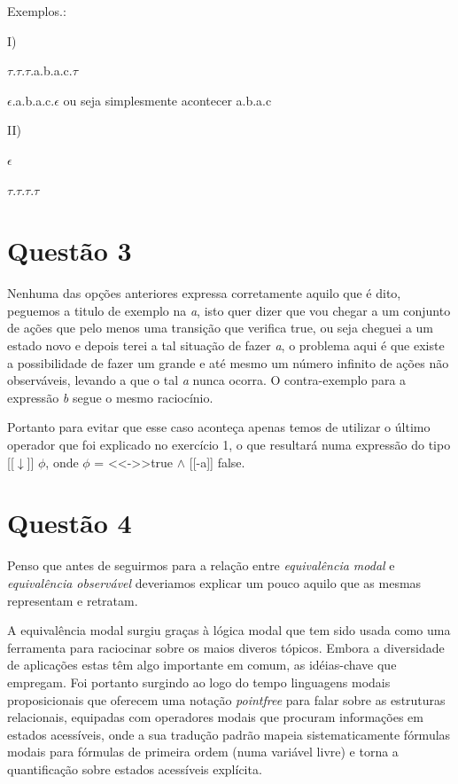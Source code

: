 \documentclass[11pt,a4paper]{report}
\begin{document}
Exemplos.:

I)

$\tau$.$\tau$.$\tau$.a.b.a.c.$\tau$

$\epsilon$.a.b.a.c.$\epsilon$ ou seja simplesmente acontecer a.b.a.c

II)

$\epsilon$

$\tau$.$\tau$.$\tau$.$\tau$

\section{Questão 3}

Nenhuma das opções anteriores expressa corretamente aquilo que é dito, peguemos a titulo de exemplo na \emph{a}, isto quer dizer que vou chegar a um conjunto de ações que pelo menos uma transição que verifica true, ou seja cheguei a um estado novo e depois terei a tal situação de fazer \emph{a}, o problema aqui é que existe a possibilidade de fazer um grande e até mesmo um número infinito de ações não observáveis, levando a que o tal \emph{a} nunca ocorra. O contra-exemplo para a expressão \emph{b} segue o mesmo raciocínio. 

Portanto para evitar que esse caso aconteça apenas temos de utilizar o último operador que foi explicado no exercício 1, o que resultará numa expressão do tipo  [[$\downarrow$]] $\phi$, onde $\phi$ = \textless\textless -\textgreater\textgreater true $\wedge$ [[-a]] false.

\section{Questão 4}

Penso que antes de seguirmos para a relação entre \emph{equivalência modal} e \emph{equivalência observável} deveriamos explicar um pouco aquilo que as mesmas representam e retratam.

A equivalência modal surgiu graças à lógica modal que tem sido usada como uma ferramenta para raciocinar sobre os maios diveros tópicos. Embora a diversidade de aplicações estas têm algo importante em comum, as idéias-chave que empregam. Foi portanto surgindo ao logo do tempo linguagens modais proposicionais que oferecem uma notação \emph{pointfree} para falar sobre as estruturas relacionais, equipadas com operadores modais que procuram informações em estados acessíveis, onde a sua tradução padrão mapeia sistematicamente fórmulas modais para fórmulas de primeira ordem (numa variável livre) e torna a quantificação sobre estados acessíveis explícita.
\end{document}
